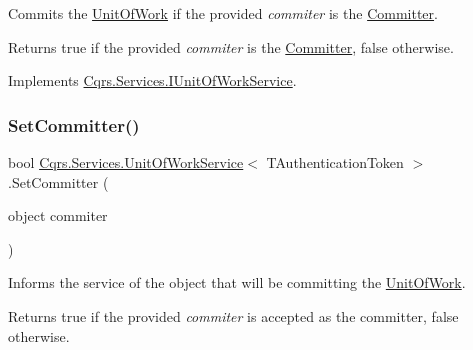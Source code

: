 Commits the \hyperlink{classCqrs_1_1Services_1_1UnitOfWorkService_a1ba76512e37e5006c2b65d071803e99f_a1ba76512e37e5006c2b65d071803e99f}{Unit\+Of\+Work} if the provided {\itshape commiter}  is the \hyperlink{classCqrs_1_1Services_1_1UnitOfWorkService_aabeccb6ba949fe02b8676b324f85950b_aabeccb6ba949fe02b8676b324f85950b}{Committer}. 

\begin{DoxyReturn}{Returns}
true if the provided {\itshape commiter}  is the \hyperlink{classCqrs_1_1Services_1_1UnitOfWorkService_aabeccb6ba949fe02b8676b324f85950b_aabeccb6ba949fe02b8676b324f85950b}{Committer}, false otherwise. 
\end{DoxyReturn}


Implements \hyperlink{interfaceCqrs_1_1Services_1_1IUnitOfWorkService_a3bd8a6a931fc6f457d136d979d26cead_a3bd8a6a931fc6f457d136d979d26cead}{Cqrs.\+Services.\+I\+Unit\+Of\+Work\+Service}.

\mbox{\label{classCqrs_1_1Services_1_1UnitOfWorkService_a663471bc62f79df22c800ad683a27f59_a663471bc62f79df22c800ad683a27f59}} 
\subsubsection{\texorpdfstring{Set\+Committer()}{SetCommitter()}}
{\footnotesize\ttfamily bool \hyperlink{classCqrs_1_1Services_1_1UnitOfWorkService}{Cqrs.\+Services.\+Unit\+Of\+Work\+Service}$<$ T\+Authentication\+Token $>$.Set\+Committer (\begin{DoxyParamCaption}\item[{object}]{commiter }\end{DoxyParamCaption})}



Informs the service of the object that will be committing the \hyperlink{classCqrs_1_1Services_1_1UnitOfWorkService_a1ba76512e37e5006c2b65d071803e99f_a1ba76512e37e5006c2b65d071803e99f}{Unit\+Of\+Work}. 

\begin{DoxyReturn}{Returns}
true if the provided {\itshape commiter}  is accepted as the committer, false otherwise. 
\end{DoxyReturn}


